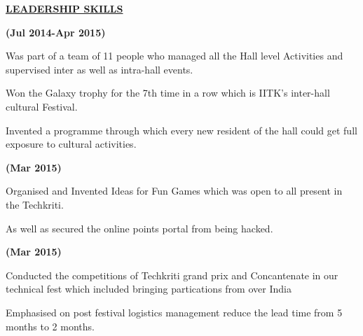 \documentclass[letterpaper]{deedy-resume} %
\begin{document}
\begin{minipage}[t]{1.00\textwidth} %


{\uppercase\uline{\textbf{\large{Leadership Skills}}\hfill}}

\microspace
{}
\hfill {\textbf{(Jul 2014-Apr 2015)}}\\
\begin{tightitemize}
\item Was part of a team of 11 people who managed all the Hall level Activities and supervised inter as well as intra-hall events.
\item Won the Galaxy trophy for the 7th time in a row which is IITK's inter-hall cultural Festival.
\item Invented a programme through which every new resident of the hall could get full exposure to cultural activities.
\end{tightitemize}

\minispace

\hfill {\textbf{(Mar 2015)}}\\
\begin{tightitemize}
\item Organised and Invented Ideas for Fun Games which was open to all present in the Techkriti.
\item As well as secured the online points portal from being hacked.
\end{tightitemize}

\minispace

\hfill {\textbf{(Mar 2015)}}\\
\begin{tightitemize}
\item Conducted the competitions of Techkriti grand prix and Concantenate in our technical fest which included bringing partications from over India
\item Emphasised on post festival logistics management reduce the lead time from 5 months to 2 months.
\end{tightitemize}

\minispace


\end{minipage}
\end{document}
